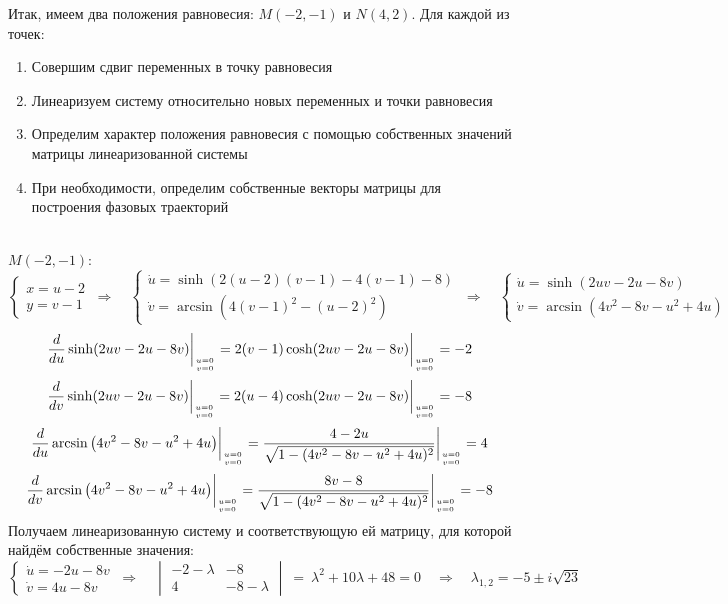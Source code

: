 \documentclass[a4paper]{article}
\newcommand{\at}{\biggr\rvert}
\begin{document}
Итак, имеем два положения равновесия: $M(-2, -1)$ и $N(4, 2)$. Для каждой из точек: \begin{enumerate}
    \item Совершим сдвиг переменных в точку равновесия
    \item Линеаризуем систему относительно новых переменных и точки равновесия
    \item Определим характер положения равновесия с помощью собственных значений матрицы линеаризованной системы
    \item При необходимости, определим собственные векторы матрицы для построения фазовых траекторий
\end{enumerate}\,\\
$M(-2, -1)$:
$$\begin{cases}
        x = u - 2 \\
        y = v - 1
    \end{cases} \  \Rightarrow \quad \begin{cases}
        \dot{u} = \sinh(2(u - 2)(v - 1) - 4(v - 1) - 8) \\
        \dot{v} = \arcsin\left( 4(v - 1)^2 - (u - 2)^2 \right)
    \end{cases} \ \Rightarrow\quad \begin{cases}
        \dot{u} = \sinh(2 u v - 2 u - 8 v) \\
        \dot{v} = \arcsin\left( 4v^2 - 8v - u^2 + 4u \right)
    \end{cases}$$
$$\frac{d}{du}\sinh(2 u v - 2 u - 8 v)\at_{u=0 \atop v=0} = 2(v-1)\cosh(2uv-2u-8v)\at_{u=0 \atop v=0} = -2$$
$$\frac{d}{dv}\sinh(2 u v - 2 u - 8 v)\at_{u=0 \atop v=0} = 2(u-4)\cosh(2uv-2u-8v)\at_{u=0 \atop v=0} = -8$$
$$\frac{d}{du}\arcsin\left( 4v^2 - 8v - u^2 + 4u \right)\at_{u=0 \atop v=0} = \frac{4-2u}{\sqrt{1 - (4v^2 - 8v - u^2 + 4u)^2}}\at_{u=0 \atop v=0} = 4$$
$$\frac{d}{dv}\arcsin\left( 4v^2 - 8v - u^2 + 4u \right)\at_{u=0 \atop v=0} = \frac{8v-8}{\sqrt{1 - (4v^2 - 8v - u^2 + 4u)^2}}\at_{u=0 \atop v=0} = -8$$
Получаем линеаризованную систему и соответствующую ей матрицу, для которой найдём собственные значения:
$$\begin{cases}
        \dot{u} = -2u-8v \\
        \dot{v} = 4u-8v
    \end{cases} \ \Rightarrow\quad \begin{vmatrix}
        -2-\lambda & -8         \\
        4          & -8-\lambda
    \end{vmatrix} \ =\ \lambda^{2} + 10 \lambda + 48 = 0 \quad\Rightarrow\quad \lambda_{1,2} = -5 \pm i\sqrt{23}$$
\end{document}
